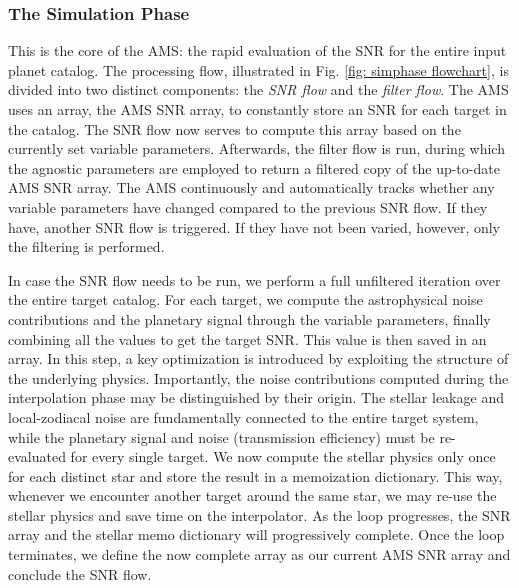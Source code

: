 \documentclass[12pt,a4paper]{article}
\numberwithin{equation}{section}
\numberwithin{figure}{section}
\numberwithin{table}{section}
\begin{document}
\subsubsection{The Simulation Phase}
This is the core of the AMS: the rapid evaluation of the SNR for the entire input planet catalog. The processing flow, illustrated in Fig. \ref{fig: simphase flowchart}, is divided into two distinct components: the \textit{SNR flow} and the \textit{filter flow}. The AMS uses an array, the AMS SNR array, to constantly store an SNR for each target in the catalog. The SNR flow now serves to compute this array based on the currently set variable parameters. Afterwards, the filter flow is run, during which the agnostic parameters are employed to return a filtered copy of the up-to-date AMS SNR array. The AMS continuously and automatically tracks whether any variable parameters have changed compared to the previous SNR flow. If they have, another SNR flow is triggered. If they have not been varied, however, only the filtering is performed.

In case the SNR flow needs to be run, we perform a full unfiltered iteration over the entire target catalog. For each target, we compute the astrophysical noise contributions and the planetary signal through the variable parameters, finally combining all the values to get the target SNR. This value is then saved in an array. In this step, a key optimization is introduced by exploiting the structure of the underlying physics. Importantly, the noise contributions computed during the interpolation phase may be distinguished by their origin. The stellar leakage and local-zodiacal noise are fundamentally connected to the entire target system, while the planetary signal and noise (transmission efficiency) must be re-evaluated for every single target. We now compute the stellar physics only once for each distinct star and store the result in a memoization dictionary. This way, whenever we encounter another target around the same star, we may re-use the stellar physics and save time on the interpolator. As the loop progresses, the SNR array and the stellar memo dictionary will progressively complete. Once the loop terminates, we define the now complete array as our current AMS SNR array and conclude the SNR flow.
\end{document}
